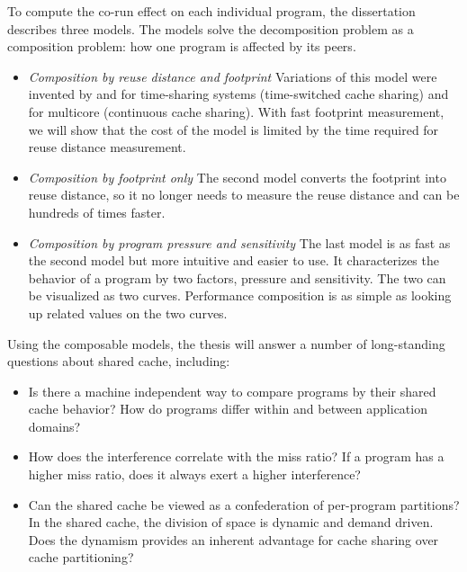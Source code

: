 To compute the co-run effect on each individual program, the
dissertation describes three models.  The models solve the decomposition
problem as a composition problem: how one program is affected
by its peers.


\begin{itemize}
\item \emph{Composition by reuse distance and footprint} 
Variations of this model were invented by
  \cite{ThiebautS:TOCS87} and \cite{Suh+:ICS01} for time-sharing systems (time-switched cache sharing) and \cite{Chandra+:HPCA05} for multicore (continuous cache sharing).  With fast
  footprint measurement, we will show that the cost of the model is limited by the time
  required for reuse distance measurement.
\item \emph{Composition by footprint only} The second model converts the
  footprint into reuse distance, so it no longer needs to measure 
the reuse distance and can be
  hundreds of times faster.
\item \emph{Composition by program pressure and sensitivity} The last
  model is as fast as the second model but more intuitive and easier
  to use.  It characterizes the behavior of a program
  by two factors, pressure and sensitivity.  The two can be
  visualized as two curves.  Performance composition is as simple as
  looking up related values on the two curves.
\end{itemize}

Using the composable models, the thesis will answer a number of
long-standing questions about shared cache, including:

\begin{itemize}
\item Is there a machine independent way to compare programs by their
  shared cache behavior?  How do programs differ within and
  between application domains?
\item How does the interference correlate with the miss ratio?  If a
  program has a higher miss ratio, does it always exert a higher interference?
\item Can the shared cache be viewed as a confederation of per-program
  partitions?  In the shared cache, the division of space is dynamic and
  demand driven.  Does the dynamism provides an inherent advantage
  for cache sharing over cache partitioning?
\end{itemize}

